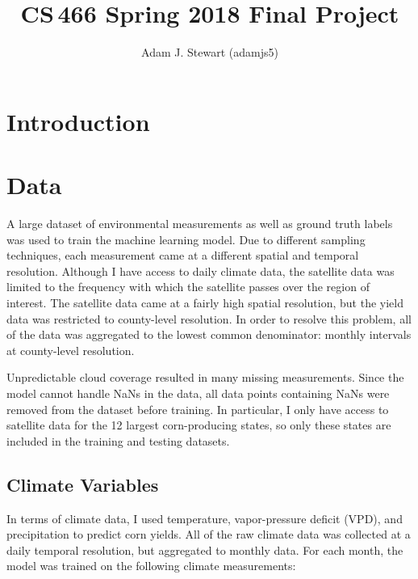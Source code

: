 \documentclass[letterpaper]{article}
\begin{document}
\title{CS\,466 Spring 2018 Final Project}
\author{Adam J. Stewart (adamjs5)}

\maketitle

\section{Introduction}



\section{Data}

A large dataset of environmental measurements as well as ground truth labels was used to train the machine learning model. Due to different sampling techniques, each measurement came at a different spatial and temporal resolution. Although I have access to daily climate data, the satellite data was limited to the frequency with which the satellite passes over the region of interest. The satellite data came at a fairly high spatial resolution, but the yield data was restricted to county-level resolution. In order to resolve this problem, all of the data was aggregated to the lowest common denominator: monthly intervals at county-level resolution.

Unpredictable cloud coverage resulted in many missing measurements. Since the model cannot handle NaNs in the data, all data points containing NaNs were removed from the dataset before training. In particular, I only have access to satellite data for the 12 largest corn-producing states, so only these states are included in the training and testing datasets.

\subsection{Climate Variables}

In terms of climate data, I used temperature, vapor-pressure deficit (VPD), and precipitation to predict corn yields. All of the raw climate data was collected at a daily temporal resolution, but aggregated to monthly data. For each month, the model was trained on the following climate measurements:
\end{document}
